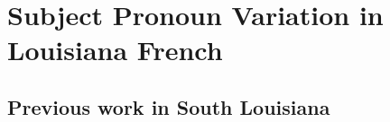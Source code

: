 \chapter{Subject Pronoun Variation in Louisiana French}
  \section{Previous work in South Louisiana}

